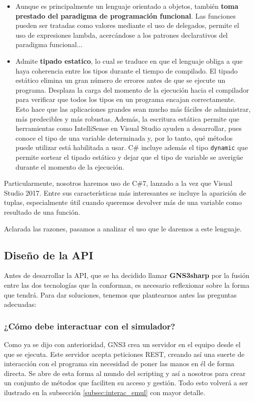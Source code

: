 \begin{itemize}
\begin{itemize}
\item Aunque es principalmente un lenguaje orientado a objetos, también \textbf{toma prestado del paradigma de programación funcional}. Las funciones pueden ser tratadas como valores mediante el uso de delegados, permite el uso de expresiones lambda, acercándose a los patrones declarativos del paradigma funcional...
\item Admite \textbf{tipado estatico}, lo cual se traduce en que el lenguaje obliga a que haya coherencia entre los tipos durante el tiempo de compilado. El tipado estático elimina un gran número de errores antes de que se ejecute un programa. Desplaza la carga del momento de la ejecución hacia el compilador para verificar que todos los tipos en un programa encajan correctamente. Esto hace que las aplicaciones grandes sean mucho más fáciles de administrar, más predecibles y más robustas. Además, la escritura estática permite que herramientas como IntelliSense en Visual Studio ayuden a desarrollar, pues conoce el tipo de una variable determinada y, por lo tanto, qué métodos puede utilizar está habilitada a usar. C\# incluye además el tipo \texttt{dynamic} que permite sortear el tipado estático y dejar que el tipo de variable se averigüe durante el momento de la ejecución\cite{csnutshell}.
\end{itemize}
Particularmente, nosotros haremos uso de C\#7, lanzado a la vez que Visual Studio 2017. Entre sus características más interesantes se incluye la aparición de tuplas, especialmente útil cuando queremos devolver más de una variable como resultado de una función.
\end{itemize}
Aclarada las razones, pasamos a analizar el uso que le daremos a este lenguaje.

\subsection{Diseño de la API}
Antes de desarrollar la API, que se ha decidido llamar \textbf{GNS3sharp} por la fusión entre las dos tecnologías que la conforman, es necesario reflexionar sobre la forma que tendrá. Para dar soluciones, tenemos que plantearnos antes las preguntas adecuadas:
\subsubsection[Interacción con GNS3]{¿Cómo debe interactuar con el simulador?}
Como ya se dijo con anterioridad, GNS3 crea un servidor en el equipo desde el que se ejecuta. Este servidor acepta peticiones REST, creando así una suerte de interacción con el programa sin necesidad de poner las manos en él de forma directa. Se abre de esta forma al mundo del scripting y así a nosotros para crear un conjunto de métodos que faciliten su acceso y gestión. Todo esto volverá a ser ilustrado en la subsección \ref{subsec:interac_emul} con mayor detalle.

